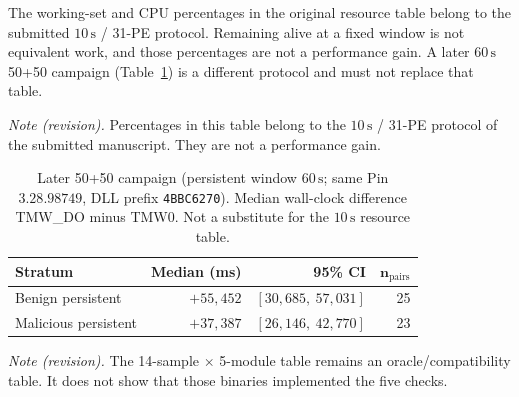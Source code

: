 The working-set and CPU percentages in the original resource table belong to the submitted $10\,\mathrm{s}$ / 31-PE protocol. Remaining alive at a fixed window is not equivalent work, and those percentages are not a performance gain. A later $60\,\mathrm{s}$ 50+50 campaign (Table~\ref{tab:wall_60s_5050}) is a different protocol and must not replace that table.

\textit{Note (revision).} Percentages in this table belong to the $10\,\mathrm{s}$ / 31-PE protocol of the submitted manuscript. They are not a performance gain.

\begin{table}[t]
\caption{Later 50+50 campaign (persistent window $60\,\mathrm{s}$; same Pin $3.28.98749$, DLL prefix \texttt{4BBC6270}). Median wall-clock difference TMW\_DO minus TMW0. Not a substitute for the $10\,\mathrm{s}$ resource table.}
\label{tab:wall_60s_5050}
\centering
\small
\begin{tabular}{lrrr}
\toprule
\textbf{Stratum} & \textbf{Median (ms)} & \textbf{95\% CI} & $\mathbf{n_{\mathrm{pairs}}}$ \\
\midrule
Benign persistent & $+55{,}452$ & $[30{,}685,\ 57{,}031]$ & 25 \\
Malicious persistent & $+37{,}387$ & $[26{,}146,\ 42{,}770]$ & 23 \\
\bottomrule
\end{tabular}
\end{table}


\textit{Note (revision).} The 14-sample $\times$ 5-module table remains an oracle/compatibility table. It does not show that those binaries implemented the five checks.

